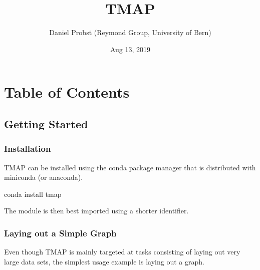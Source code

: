\documentclass[letterpaper,10pt,english]{sphinxmanual}
\title{TMAP}
\date{Aug 13, 2019}
\author{Daniel Probst (Reymond Group, University of Bern)}
\begin{document}
\pagestyle{empty}
\sphinxmaketitle
\pagestyle{plain}
\sphinxtableofcontents
\pagestyle{normal}
\label{\detokenize{index::doc}}



\chapter{Table of Contents}
\label{\detokenize{index:table-of-contents}}

\section{Getting Started}
\label{\detokenize{tutorial:getting-started}}\label{\detokenize{tutorial::doc}}

\subsection{Installation}
\label{\detokenize{tutorial:installation}}
TMAP can be installed using the conda package manager that
is distributed with miniconda (or anaconda).

\begin{sphinxVerbatim}[commandchars=\\\{\}]
conda install tmap
\end{sphinxVerbatim}

The module is then best imported using a shorter identifier.

\begin{sphinxVerbatim}[commandchars=\\\{\}]
   
\end{sphinxVerbatim}


\subsection{Laying out a Simple Graph}
\label{\detokenize{tutorial:laying-out-a-simple-graph}}
Even though TMAP is mainly targeted at tasks consisting of
laying out very large data sets, the simplest usage example
is laying out a graph.
\end{document}
